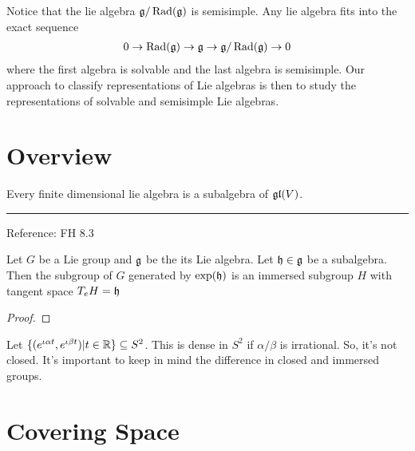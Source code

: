 Notice that the lie algebra $\mathfrak{g}/\operatorname{Rad}(\mathfrak{g})$ is semisimple. Any lie algebra fits into the exact sequence
\begin{align}
    0\to \operatorname{Rad}(\mathfrak{g}) \to \mathfrak{g} \to \mathfrak{g}/\operatorname{Rad}(\mathfrak{g}) \to 0
\end{align}
where the first algebra is solvable and the last algebra is semisimple. Our approach to classify representations of Lie  algebras is then to study the representations of solvable and semisimple Lie algebras.



\section{Overview}




\begin{theorem}
Every finite dimensional lie algebra is a subalgebra of $\mathfrak{gl}(V)$.
\end{theorem}

\begin{theorem}
    
\end{theorem}

\vspace{1em}
\hrule
\vspace{1em}

Reference: FH 8.3
\begin{proposition}
    Let $G$ be a Lie group and $\mathfrak{g}$ be the its Lie algebra. Let $\mathfrak{h}\in \mathfrak{g}$ be a subalgebra. 
    Then the subgroup of $G$ generated by $\exp(\mathfrak{h})$ is an immersed subgroup $H$ with tangent space $T_eH=\mathfrak{h}$
\end{proposition}
\begin{proof}
\end{proof}


\begin{insight}
    Let $\{(e^{\iota \alpha t}, e^{\iota\beta t})| t\in \mathbb{R}\} \subseteq S^2 $. This is dense in $S^2$ if $\alpha/\beta$ is irrational. So, it's not closed. It's important to keep in mind the difference in closed and immersed groups. 
\end{insight}



\section{Covering Space}
\label{sec:covering_space}

